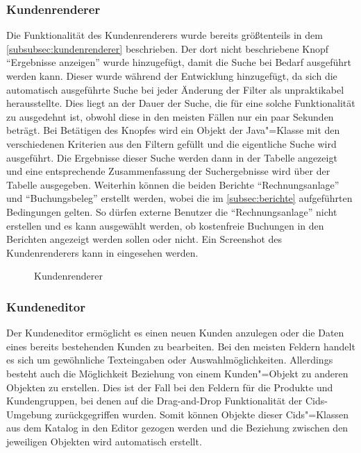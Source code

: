 \subsubsection{Kundenrenderer}
Die Funktionalität des Kundenrenderers wurde bereits größtenteils in dem \autoref{subsubsec:kundenrenderer} beschrieben.
Der dort nicht beschriebene Knopf "`Ergebnisse anzeigen"' wurde hinzugefügt, damit die Suche bei Bedarf ausgeführt werden kann.
Dieser wurde während der Entwicklung hinzugefügt, da sich die automatisch ausgeführte Suche bei jeder Änderung der Filter als unpraktikabel herausstellte.
Dies liegt an der Dauer der Suche, die für eine solche Funktionalität zu ausgedehnt ist, obwohl diese in den meisten Fällen nur ein paar Sekunden beträgt.
Bei Betätigen des Knopfes wird ein Objekt der Java"=Klasse  mit den verschiedenen Kriterien aus den Filtern gefüllt und die eigentliche Suche wird ausgeführt.
Die Ergebnisse dieser Suche werden dann in der Tabelle angezeigt und eine entsprechende Zusammenfassung der Suchergebnisse wird über der Tabelle ausgegeben.
Weiterhin können die beiden Berichte \enquote{Rechnungsanlage} und \enquote{Buchungsbeleg} erstellt werden, wobei die im \autoref{subsec:berichte} aufgeführten Bedingungen gelten.
So dürfen externe Benutzer die \enquote{Rechnungsanlage} nicht erstellen und es kann ausgewählt werden, ob kostenfreie Buchungen in den Berichten angezeigt werden sollen oder nicht.
Ein Screenshot des Kundenrenderers kann in  eingesehen werden.

\begin{figure}[htb]
	\centering
	\caption{Kundenrenderer}
	\label{fig:kundenrenderer}
\end{figure}
\subsubsection{Kundeneditor}
Der Kundeneditor ermöglicht es einen neuen Kunden anzulegen oder die Daten eines bereits bestehenden Kunden zu bearbeiten.
Bei den meisten Feldern handelt es sich um gewöhnliche Texteingaben oder Auswahlmöglichkeiten.
Allerdings besteht auch die Möglichkeit Beziehung von einem Kunden"=Objekt zu anderen Objekten zu erstellen.
Dies ist der Fall bei den Feldern für die Produkte und Kundengruppen, bei denen auf die Drag-and-Drop Funktionalität der Cids-Umgebung zurückgegriffen wurden.
Somit können Objekte dieser Cids"=Klassen aus dem Katalog in den Editor gezogen werden und die Beziehung zwischen den jeweiligen Objekten wird automatisch erstellt.


